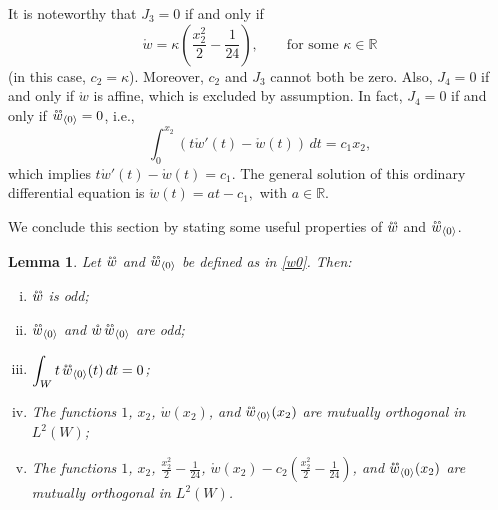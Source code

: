 \documentclass[a4, 11pt, reqno, final]{amsart}
\newcommand\ringring[1]{%
	{%
		\mathop{\kern0pt #1}\limits^{%
			\vbox to-1.85ex{
				\kern-2ex %
				\hbox to 0pt{\hss\normalfont\kern.1em \r{}\kern-.45em \r{}\hss}%
				\vss %
			}%
		}%
	}%
}
\theoremstyle{plain}%
\newtheorem{lemma}[theorem]{Lemma}
\begin{document}
	It is noteworthy that $J_3 = 0$ if and only if
	$$
	\mathring{w} = \kappa \left( \frac{x_2^2}{2} - \frac{1}{24} \right), \qquad \text{for some } \kappa \in \mathbb{R}
	$$
	(in this case, $c_2 = \kappa$). Moreover, $c_2$ and $J_3$ cannot both be zero. Also, $J_4 = 0$ if and only if $\mathring{w}$ is affine, which is excluded by assumption. In fact, $J_4 = 0$ if and only if $\ringring{w}_{\langle 0 \rangle} = 0$, i.e.,
	$$
	\int_{0}^{x_2} \left(t \mathring{w}'(t) - \mathring{w}(t)\right) \, dt = c_1 x_2,
	$$
	which implies $t \mathring{w}'(t) - \mathring{w}(t) = c_1$. The general solution of this ordinary differential equation is
	$\mathring{w}(t) = at - c_1,$ with $a \in \mathbb{R}.$

	We conclude this section by stating some useful properties of $\ringring{w}$ and $\ringring{w}_{\langle 0 \rangle}$.

	\begin{lemma}\label{lemmaw0}
		Let $\ringring{w}$ and $\ringring{w}_{\langle 0 \rangle}$ be defined as in \eqref{w0}. Then:
		\begin{enumerate}[(i)]
			\item $\ringring{w}$ is odd;
			\item $\ringring{w}_{\langle 0 \rangle}$ and $\mathring{w} \, \ringring{w}_{\langle 0 \rangle}$ are odd;
			\item $\displaystyle \int_W t \, \ringring{w}_{\langle 0 \rangle}(t) \, dt = 0$;
			\item The functions $1$, $x_2$, $\mathring{w}(x_2)$, and $\ringring{w}_{\langle 0 \rangle}(x_2)$ are mutually orthogonal in $L^2(W)$;
			\item The functions $1$, $x_2$, $\displaystyle \frac{x_2^2}{2} - \frac{1}{24}$, $\mathring{w}(x_2) - c_2 \left( \frac{x_2^2}{2} - \frac{1}{24} \right)$, and $\ringring{w}_{\langle 0 \rangle}(x_2)$ are mutually orthogonal in $L^2(W)$.
		\end{enumerate}
	\end{lemma}
\end{document}
